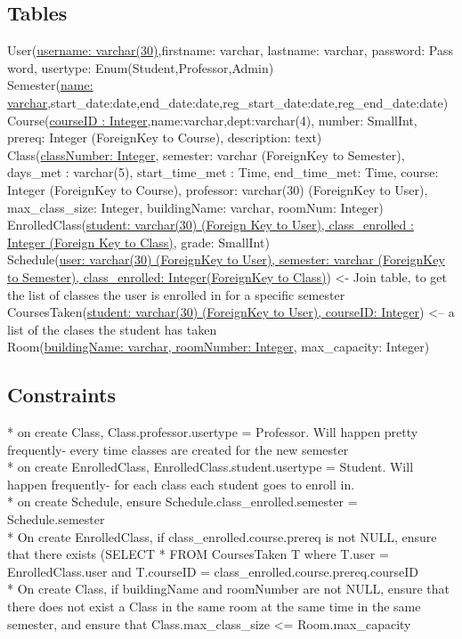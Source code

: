 \documentclass[11pt,oneside,a4paper]{article}
\begin{document}
\subsection{Tables}
User(\underline{username: varchar(30)},firstname: varchar, lastname: varchar,
password: Pass	word, usertype: Enum(Student,Professor,Admin)
\\
Semester(\underline{name:
varchar},start\_date:date,end\_date:date,reg\_start\_date:date,reg\_end\_date:date)
\\
Course(\underline{courseID	: Integer},name:varchar,dept:varchar(4), number:
SmallInt, prereq: Integer (ForeignKey to Course), description: text)
\\
Class(\underline{classNumber: Integer}, semester: varchar (ForeignKey to
Semester), days\_met : varchar(5), start\_time\_met : Time, end\_time\_met:
Time, course: Integer (ForeignKey to Course), professor: varchar(30)
(ForeignKey to User), max\_class\_size: Integer, buildingName: varchar,
roomNum: Integer)
\\
EnrolledClass(\underline{student: varchar(30) (Foreign Key to User),
class\_enrolled : Integer (Foreign Key to Class)}, grade: SmallInt)
\\
Schedule(\underline{user: varchar(30) (ForeignKey to User), semester: varchar
(ForeignKey to Semester), class\_enrolled: Integer(ForeignKey to Class)}) <-
Join table, to get the list of classes the user is enrolled in for a specific
semester
\\
CoursesTaken(\underline{student: varchar(30) (ForeignKey to User), courseID:
Integer}) <-- a list of the clases the student has taken\\
Room(\underline{buildingName: varchar, roomNumber: Integer}, max\_capacity:
Integer)
\subsection{Constraints}
	* on create Class, Class.professor.usertype = Professor. Will happen pretty
	frequently- every time classes are created for the new semester\\
	* on create EnrolledClass, EnrolledClass.student.usertype = Student. Will
	happen frequently- for each class each student goes to enroll in.\\
	* on create Schedule, ensure Schedule.class\_enrolled.semester =
	Schedule.semester\\
	* On create EnrolledClass, if class\_enrolled.course.prereq is not NULL, ensure
	that there exists (SELECT * FROM CoursesTaken T where T.user =
	EnrolledClass.user and T.courseID =
	class\_enrolled.course.prereq.courseID\\
	* On create Class, if buildingName and roomNumber are not NULL, ensure that
	there does not exist a Class in the same room at the same time in the same
	semester, and ensure that Class.max\_class\_size <= Room.max\_capacity
\end{document}
